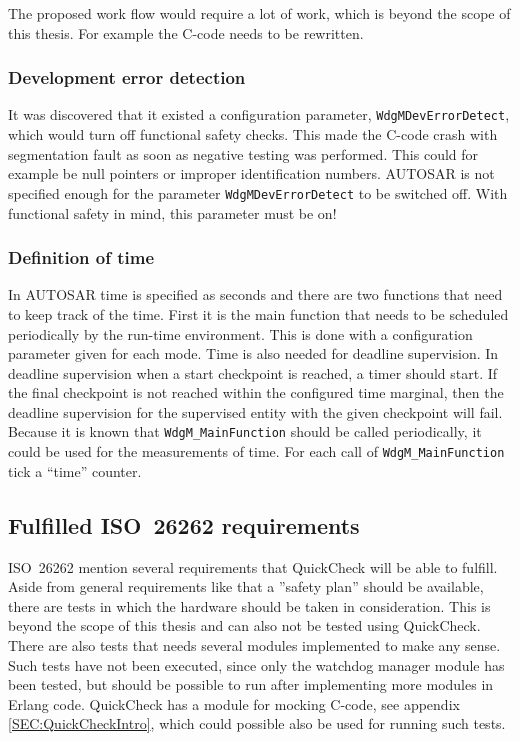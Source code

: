The proposed work flow would require a lot of work, which is beyond the scope of
this thesis. For example the C-code needs to be rewritten.

\subsubsection{Development error detection}
\label{SEC:DEVERRORDETECT}
It was discovered that it existed a configuration parameter,
\lstinline!WdgMDevErrorDetect!, which would turn off functional safety
checks. This made the C-code crash with segmentation fault as soon as
negative testing was performed. This could for example be null pointers or
improper identification numbers. AUTOSAR is not specified enough for
the parameter \lstinline!WdgMDevErrorDetect!  to be switched off. With
functional safety in mind, this parameter must be on!

\subsubsection{Definition of time}
\label{SEC:FUNCTIONAL_SAFETY_TIME}
In AUTOSAR time is specified as seconds and there are two functions that need to
keep track of the time. First it is the main function that needs to be scheduled
periodically by the run-time environment. This is done with a configuration
parameter given for each mode. Time is also needed for deadline supervision. In
deadline supervision when a start checkpoint is reached, a timer should
start. If the final checkpoint is not reached within the configured time
marginal, then the deadline supervision for the supervised entity with the given
checkpoint will fail. Because it is known that \lstinline!WdgM_MainFunction! should
be called periodically, it could be used for the measurements of time. For each
call of \lstinline!WdgM_MainFunction! tick a ``time'' counter.


\subsection{Fulfilled ISO~26262 requirements}
ISO~26262 mention several requirements that QuickCheck will be able to
fulfill. Aside from general requirements like that a ''safety plan'' should be
available, there are tests in which the hardware should be taken in
consideration. This is beyond the scope of this thesis and can also not be
tested using QuickCheck. There are also tests that needs several modules
implemented to make any sense. Such tests have not been executed, since only the
watchdog manager module has been tested, but should be possible to run after
implementing more modules in Erlang code. QuickCheck has a module for
mocking C-code, see appendix \ref{SEC:QuickCheckIntro}, which could
possible also be used for running such tests.

